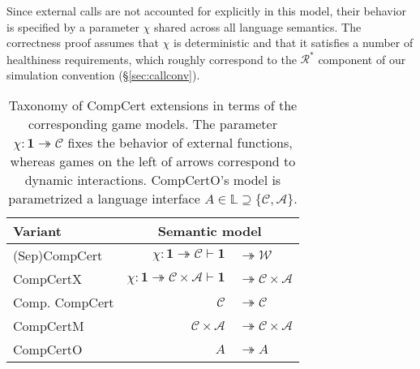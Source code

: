 \documentclass[sigplan,screen]{acmart}
\newcommand{\figsize}{\small}
\begin{document}
Since external calls are not accounted for explicitly
in this model,
their behavior is specified by a parameter $\chi$
shared across all language semantics.
The correctness proof assumes that $\chi$ is deterministic
and that it satisfies a number of healthiness requirements,
which roughly correspond to
the $\mathcal{R}^*$ component of our simulation convention (\S\ref{sec:callconv}).


\begin{table} %
  \caption{Taxonomy of CompCert extensions
    in terms of the corresponding game models.
    The parameter $\chi : \mathbf{1} \twoheadrightarrow \mathcal{C}$
    fixes the behavior of external functions,
    whereas games on the left of arrows
    correspond to dynamic interactions.
    CompCertO's model is parametrized a language interface
    $A \in \mathbb{L} \supseteq \{\mathcal{C}, \mathcal{A}\}$.
  }
  \label{tbl:compcerts}
  \setlength\tabcolsep{1.2pt}
  \begin{tabular}{l@{\qquad}r@{}l}
    \toprule
    Variant & \multicolumn{2}{c}{Semantic model} \\ %
    \midrule
    (Sep)CompCert \cite{compcert,sepcompcert} &
      $\chi : \mathbf{1} \twoheadrightarrow \mathcal{C}
      \vdash \mathbf{1} $ & ${} \twoheadrightarrow \mathcal{W}$ \\
    CompCertX \cite{popl15} &
      \hspace{-1em}
      $\chi : \mathbf{1} \twoheadrightarrow \mathcal{C} \times \mathcal{A}
       \vdash
       \mathbf{1} $ & ${} \twoheadrightarrow \mathcal{C} \times \mathcal{A}$
       \\
    Comp. CompCert \cite{compcompcert} &
      $\mathcal{C}$ & ${} \twoheadrightarrow \mathcal{C}$ \\
    CompCertM \cite{compcertm} &
      $\mathcal{C} \times \mathcal{A} $ & ${}\twoheadrightarrow
       \mathcal{C} \times \mathcal{A}$ \\
    CompCertO &
      $A $ & ${}\twoheadrightarrow A$ \\
    \bottomrule
  \end{tabular}
\end{table}
\end{document}
